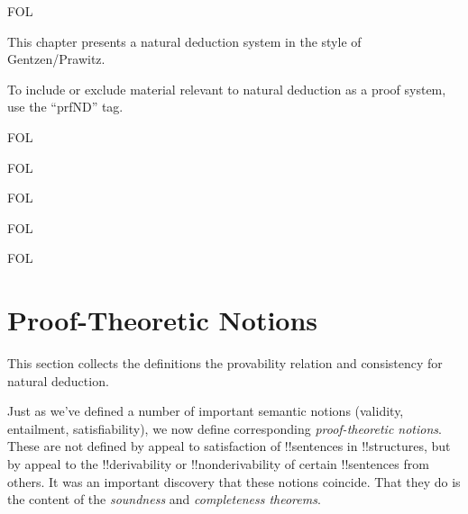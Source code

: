 \documentclass[10pt,a4paper]{article}
\theoremstyle{plain}
\theoremstyle{definition}
\theoremstyle{remark}
\newenvironment{explain}{}{}
\newenvironment{editorial}{}{}
\newcommand*{\olfileid}[3]{}
\newcommand*{\olsection}[1]{\section*{#1}}
\newcommand*{\olchapter}[3]{}
\newcommand*{\olimport}[1]{}
\providecommand{\iftag}[1]{#1}
\providecommand{\iftag}{}
\begin{document}



\iftag{FOL}
      {\olchapter{fol}{ntd}{Natural Deduction}}
      {\olchapter{pl}{ntd}{Natural Deduction}}

\begin{editorial}
This chapter presents a natural deduction system in the style of
Gentzen/Prawitz.
  
To include or exclude material relevant to natural deduction as a
proof system, use the ``prfND'' tag.
\end{editorial}

\olimport{rules-and-proofs}

\olimport{propositional-rules}

\iftag{FOL}{%
  \olimport{quantifier-rules}
}{}

\olimport{derivations}

\olimport{proving-things}

\iftag{FOL}{%
  \olimport{proving-things-quant}
}{}

\olimport{proof-theoretic-notions}

\olimport{provability-consistency}

\olimport{provability-propositional}

\iftag{FOL}{%
  \olimport{provability-quantifiers}
}{}

\olimport{soundness}

\iftag{FOL}{%
  \olimport{identity}
  \olimport{soundness-identity}
}{}

\OLEndChapterHook





\iftag{FOL}
      {\olfileid{fol}{ntd}{ptn}}
      {\olfileid{pl}{ntd}{ptn}}

\olsection{Proof-Theoretic Notions}

\begin{editorial}
This section collects the definitions the provability relation
and consistency for natural deduction.
\end{editorial}

\begin{explain}
Just as we've defined a number of important semantic notions
(validity, entailment, satisfiability), we now define corresponding
\emph{proof-theoretic notions}.  These are not defined by appeal to
satisfaction of !!{sentence}s in !!{structure}s, but by appeal to the
!!{derivability} or !!{nonderivability} of certain !!{sentence}s from
others.  It was an important discovery that these notions coincide.
That they do is the content of the \emph{soundness} and
\emph{completeness theorems}.
\end{explain}
\end{document}

